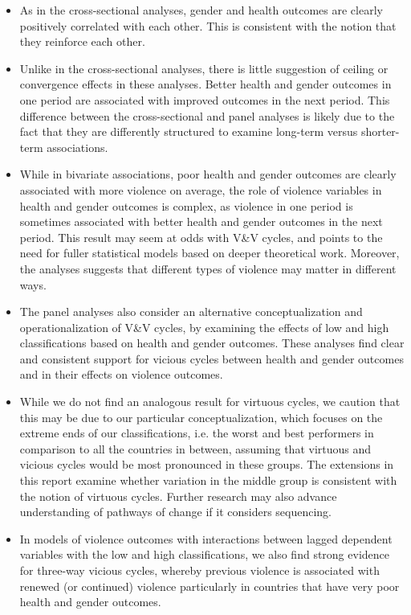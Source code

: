 \documentclass[12pt]{article}
\begin{document}
\begin{itemize}
\item As in the cross-sectional analyses, gender and health outcomes are clearly positively correlated with each other. This is consistent with the notion that they reinforce each other.
\item Unlike in the cross-sectional analyses, there is little suggestion of ceiling or convergence effects in these analyses. Better health and gender outcomes in one period are associated with improved outcomes in the next period. This difference between the cross-sectional and panel analyses is likely due to the fact that they are differently structured to examine long-term versus shorter-term associations.
\item While in bivariate associations, poor health and gender outcomes are clearly associated with more violence on average, the role of violence variables in health and gender outcomes is complex, as violence in one period is sometimes associated with better health and gender outcomes in the next period. This result may seem at odds with V\&V cycles, and points to the need for fuller statistical models based on deeper theoretical work. Moreover, the analyses suggests that different types of violence may matter in different ways.
\item The panel analyses also consider an alternative conceptualization and operationalization of V\&V cycles, by examining the effects of low and high classifications based on health and gender outcomes. These analyses find clear and consistent support for vicious cycles between health and gender outcomes and in their effects on violence outcomes.
\item While we do not find an analogous result for virtuous cycles, we caution that this may be due to our particular conceptualization, which focuses on the extreme ends of our classifications, i.e. the worst and best performers in comparison to all the countries in between, assuming that virtuous and vicious cycles would be most pronounced in these groups. The extensions in this report examine whether variation in the middle group is consistent with the notion of virtuous cycles. Further research may also advance understanding of pathways of change if it considers sequencing.
\item In models of violence outcomes with interactions between lagged dependent variables with the low and high classifications, we also find strong evidence for three-way vicious cycles, whereby previous violence is associated with renewed (or continued) violence particularly in countries that have very poor health and gender outcomes.
\end{itemize}
\end{document}
